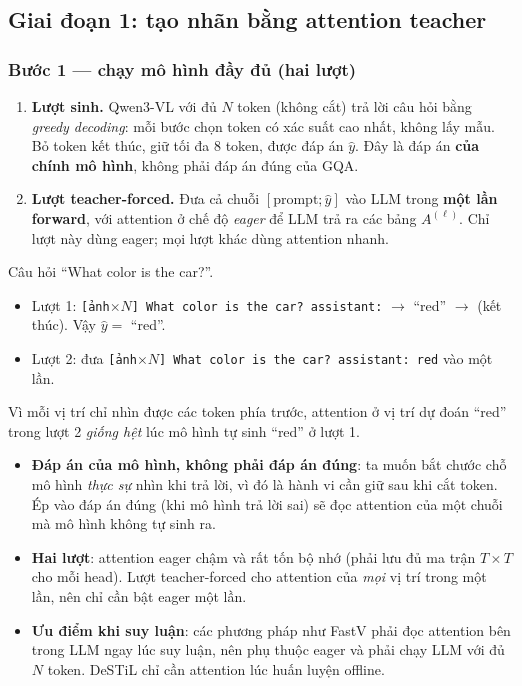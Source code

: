\documentclass[11pt,a4paper]{article}
\begin{document}
\subsection{Giai đoạn 1: tạo nhãn bằng attention teacher}
\label{sec:teacher}

\subsubsection*{Bước 1 --- chạy mô hình đầy đủ (hai lượt)}
\begin{enumerate}[leftmargin=*]
\item \textbf{Lượt sinh.} Qwen3-VL với đủ $N$ token (không cắt) trả lời câu hỏi bằng \emph{greedy decoding}: mỗi bước chọn token có xác suất cao nhất, không lấy mẫu. Bỏ token kết thúc, giữ tối đa 8 token, được đáp án $\hat y$. Đây là đáp án \textbf{của chính mô hình}, không phải đáp án đúng của GQA.
\item \textbf{Lượt teacher-forced.} Đưa cả chuỗi $[\text{prompt};\hat y]$ vào LLM trong \textbf{một lần forward}, với attention ở chế độ \emph{eager} để LLM trả ra các bảng $A^{(\ell)}$. Chỉ lượt này dùng eager; mọi lượt khác dùng attention nhanh.
\end{enumerate}

\begin{vidu}
Câu hỏi ``What color is the car?''.
\begin{itemize}
\item Lượt 1: \texttt{[ảnh$\times N$] What color is the car? assistant:} $\to$ ``red'' $\to$ (kết thúc). Vậy $\hat y=$ ``red''.
\item Lượt 2: đưa \texttt{[ảnh$\times N$] What color is the car? assistant: red} vào một lần.
\end{itemize}
Vì mỗi vị trí chỉ nhìn được các token phía trước, attention ở vị trí dự đoán ``red'' trong lượt 2 \emph{giống hệt} lúc mô hình tự sinh ``red'' ở lượt 1.
\end{vidu}

\begin{visao}
\begin{itemize}
\item \textbf{Đáp án của mô hình, không phải đáp án đúng}: ta muốn bắt chước chỗ mô hình \emph{thực sự} nhìn khi trả lời, vì đó là hành vi cần giữ sau khi cắt token. Ép vào đáp án đúng (khi mô hình trả lời sai) sẽ đọc attention của một chuỗi mà mô hình không tự sinh ra.
\item \textbf{Hai lượt}: attention eager chậm và rất tốn bộ nhớ (phải lưu đủ ma trận $T\times T$ cho mỗi head). Lượt teacher-forced cho attention của \emph{mọi} vị trí trong một lần, nên chỉ cần bật eager một lần.
\item \textbf{Ưu điểm khi suy luận}: các phương pháp như FastV phải đọc attention bên trong LLM ngay lúc suy luận, nên phụ thuộc eager và phải chạy LLM với đủ $N$ token. DeSTiL chỉ cần attention lúc huấn luyện offline.
\end{itemize}
\end{visao}
\end{document}
